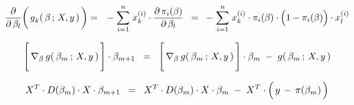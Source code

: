 \begin{eqnarray*}
\dfrac{\partial}{\partial\,\beta_{l}}\!\left(\,\overset{{\color{white}\vert}}{g}_{k}(\,\beta\,;\,X,y\,)\,\right)
& = &
	-\;\overset{n}{\underset{i=1}{\sum}}\;x^{(i)}_{k}\cdot\dfrac{\partial\,\pi_{i}(\beta)}{\partial\,\beta_{l}}
\;\; = \;\;
	-\;\overset{n}{\underset{i=1}{\sum}}\;x^{(i)}_{k}\cdot
	\pi_{i}(\beta)
	\cdot
	\left(1\overset{{\color{white}.}}{-}\pi_{i}(\beta)\right)
	\cdot
	x^{(i)}_{l}
\end{eqnarray*}

\vskip 0.5cm

\begin{equation*}
\left[\,\overset{{\color{white}\vert}}{\nabla}_{\beta}\,g(\,\beta_{m}\,;\,X,y\,)\,\right] \cdot \beta_{m+1}
\;\; = \;\;
	\left[\,\overset{{\color{white}\vert}}{\nabla}_{\beta}\,g(\,\beta_{m}\,;\,X,y\,)\,\right] \cdot \beta_{m}
	\; - \;
	g(\,\beta_{m}\,;\,X,y\,)
\end{equation*}

\begin{equation*}
X^{T} \cdot D(\beta_{m}) \cdot X \cdot \beta_{m+1}
\;\; = \;\;
	X^{T} \cdot D(\beta_{m}) \cdot X \cdot \beta_{m}
	\; - \;
	X^{T} \cdot \left(\,y \,\overset{{\color{white}.}}{-}\, \pi(\beta_{m})\,\right)
\end{equation*}



\renewcommand{\theenumi}{\roman{enumi}}
\renewcommand{\labelenumi}{\textnormal{(\theenumi)}$\;\;$}

